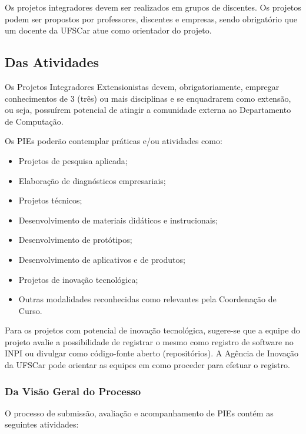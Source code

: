 Os projetos integradores devem ser realizados em grupos de discentes. Os projetos podem ser propostos por professores, discentes e empresas, sendo obrigatório que um docente da UFSCar atue como orientador do projeto.


\subsection{Das Atividades}

Os Projetos Integradores Extensionistas devem, obrigatoriamente, empregar conhecimentos de 3 (três) ou mais disciplinas e se enquadrarem como extensão, ou seja, possuírem potencial de atingir a comunidade externa ao Departamento de Computação.

Os PIEs poderão contemplar práticas e/ou atividades como:

\begin{itemize}
    \item Projetos de pesquisa aplicada;
    \item Elaboração de diagnósticos empresariais;
    \item Projetos técnicos;
    \item Desenvolvimento de materiais didáticos e instrucionais;
    \item Desenvolvimento de protótipos;
    \item Desenvolvimento de aplicativos e de produtos;
    \item Projetos de inovação tecnológica;
    \item Outras modalidades reconhecidas como relevantes pela Coordenação de Curso.
\end{itemize}

Para os projetos com potencial de inovação tecnológica, sugere-se que a equipe do projeto avalie a possibilidade de registrar o mesmo como registro de software no INPI ou divulgar como código-fonte aberto (repositórios). A Agência de Inovação da UFSCar pode orientar as equipes em como proceder para efetuar o registro.

\subsubsection{Da Visão Geral do Processo}

O processo de submissão, avaliação e acompanhamento de PIEs contém as seguintes atividades:

